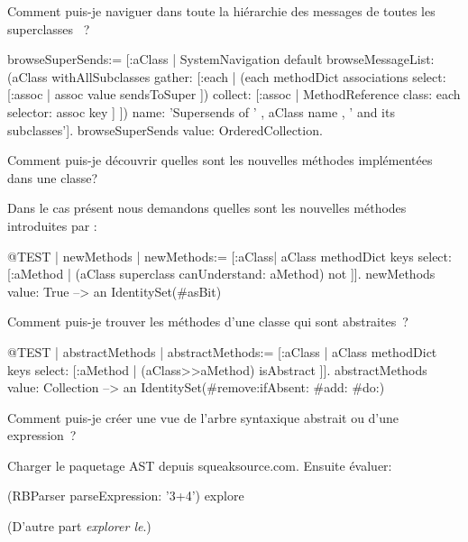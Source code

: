 \documentclass[a4paper,10pt,twoside]{book}
\begin{document}
\begin{faq}
Comment puis-je naviguer dans toute la hi\'erarchie des messages de toutes les superclasses  ~?
\end{faq}
\answer
\begin{code}{}
browseSuperSends:= [:aClass | SystemNavigation default
	browseMessageList: (aClass withAllSubclasses gather: [:each |
		(each methodDict associations
			select: [:assoc | assoc value sendsToSuper ])
				collect: [:assoc | MethodReference class: each selector: assoc key ] ])
	name: 'Supersends of ' , aClass name , ' and its subclasses'].
browseSuperSends value: OrderedCollection.
\end{code}

\begin{faq}
Comment puis-je d\'ecouvrir quelles sont les nouvelles m\'ethodes impl\'ement\'ees dans une classe?
\end{faq}
\answer
Dans le cas pr\'esent nous demandons quelles sont les nouvelles m\'ethodes introduites par :
\begin{code}{@TEST | newMethods |}
newMethods:= [:aClass| aClass methodDict keys select:
	[:aMethod | (aClass superclass canUnderstand: aMethod) not ]].
newMethods value: True --> an IdentitySet(#asBit)
\end{code}

\begin{faq}
Comment puis-je 
trouver
les m\'ethodes d'une classe qui sont abstraites~?
\end{faq}
\answer
\begin{code}{@TEST | abstractMethods |}
abstractMethods:=
	[:aClass | aClass methodDict keys select:
		[:aMethod | (aClass>>aMethod) isAbstract ]].
abstractMethods value: Collection --> an IdentitySet(#remove:ifAbsent: #add: #do:)
\end{code}

\begin{faq}
Comment puis-je cr\'eer une vue de 
l'arbre syntaxique abstrait ou 
 d'une expression~?
\end{faq}
\answer
Charger le paquetage AST depuis squeaksource.com. Ensuite \'evaluer:
\begin{code}{}
(RBParser parseExpression: '3+4') explore
\end{code}
(D'autre part \emph{explorer le}.)
\end{document}
